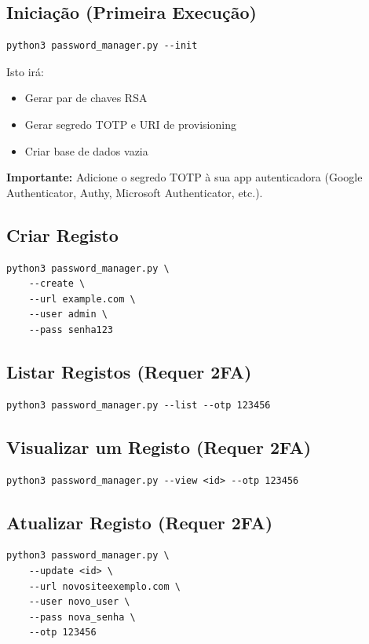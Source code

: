 \documentclass[11pt,a4paper]{article}
\begin{document}
\subsection{Inicia\c{c}\~ao (Primeira Execu\c{c}\~ao)}
\begin{lstlisting}[style=bash]
python3 password_manager.py --init
\end{lstlisting}

Isto ir\'a:
\begin{itemize}
  \item Gerar par de chaves RSA
  \item Gerar segredo TOTP e URI de provisioning
  \item Criar base de dados vazia
\end{itemize}

\textbf{Importante:} Adicione o segredo TOTP \`a sua app autenticadora (Google Authenticator, Authy, Microsoft Authenticator, etc.).

\subsection{Criar Registo}
\begin{lstlisting}[style=bash]
python3 password_manager.py \
    --create \
    --url example.com \
    --user admin \
    --pass senha123
\end{lstlisting}

\subsection{Listar Registos (Requer 2FA)}
\begin{lstlisting}[style=bash]
python3 password_manager.py --list --otp 123456
\end{lstlisting}

\subsection{Visualizar um Registo (Requer 2FA)}
\begin{lstlisting}[style=bash]
python3 password_manager.py --view <id> --otp 123456
\end{lstlisting}

\subsection{Atualizar Registo (Requer 2FA)}
\begin{lstlisting}[style=bash]
python3 password_manager.py \
    --update <id> \
    --url novositeexemplo.com \
    --user novo_user \
    --pass nova_senha \
    --otp 123456
\end{lstlisting}
\end{document}
